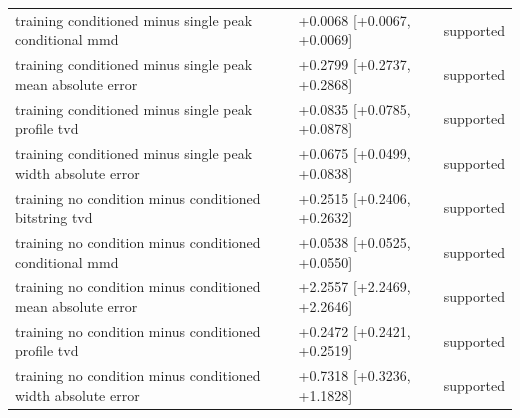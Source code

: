 \begin{table}[p]
\begin{tabular}{@{}p{}p{}p{}@{}}
training conditioned minus single peak conditional mmd & +0.0068 [+0.0067, +0.0069] & supported \\
training conditioned minus single peak mean absolute error & +0.2799 [+0.2737, +0.2868] & supported \\
training conditioned minus single peak profile tvd & +0.0835 [+0.0785, +0.0878] & supported \\
training conditioned minus single peak width absolute error & +0.0675 [+0.0499, +0.0838] & supported \\
training no condition minus conditioned bitstring tvd & +0.2515 [+0.2406, +0.2632] & supported \\
training no condition minus conditioned conditional mmd & +0.0538 [+0.0525, +0.0550] & supported \\
training no condition minus conditioned mean absolute error & +2.2557 [+2.2469, +2.2646] & supported \\
training no condition minus conditioned profile tvd & +0.2472 [+0.2421, +0.2519] & supported \\
training no condition minus conditioned width absolute error & +0.7318 [+0.3236, +1.1828] & supported \\
\bottomrule
\end{tabular}
\end{table}
\clearpage
